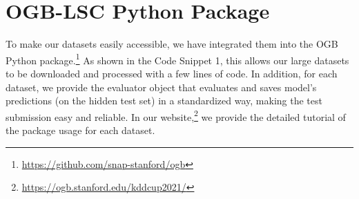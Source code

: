 \documentclass{article}
\newcommand{\nameshort}{OGB}
\newcommand{\challengeshort}{OGB-LSC}
\begin{document}
\begin{figure}[t]
    \captionsetup{justification=centering}
    \centering
    \label{tab:results_mol_modelsize}
    \renewcommand{\arraystretch}{1.1}
\end{figure} 

\section{\challengeshort{} Python Package}
\label{sec:python}
To make our datasets easily accessible, we have integrated them into the \nameshort{} Python package.\footnote{\url{https://github.com/snap-stanford/ogb}}
As shown in the Code Snippet 1, this allows our large datasets to be downloaded and processed with a few lines of code. 
In addition, for each dataset, we provide the evaluator object that evaluates and saves model's predictions (on the hidden test set) in a standardized way, making the test submission easy and reliable.
In our website,\footnote{\url{https://ogb.stanford.edu/kddcup2021/}} we provide the detailed tutorial of the package usage for each dataset.
\end{document}
